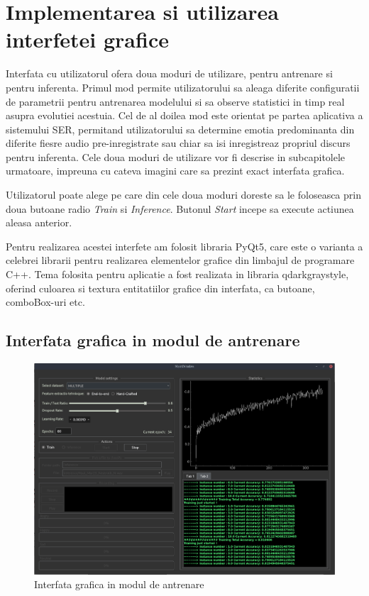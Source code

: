 \documentclass[a4paper,12pt]{book}
\begin{document}
	\section{Implementarea si utilizarea interfetei grafice}
		Interfata cu utilizatorul ofera doua moduri de utilizare, pentru antrenare si pentru inferenta. Primul mod permite utilizatorului sa aleaga diferite configuratii de parametrii pentru antrenarea modelului si sa observe statistici in timp real asupra evolutiei acestuia. Cel de al doilea mod este orientat pe partea aplicativa a sistemului SER, permitand utilizatorului sa determine emotia predominanta din diferite fiesre audio pre-inregistrate sau chiar sa isi inregistreaz propriul discurs pentru inferenta. Cele doua moduri de utilizare vor fi descrise in subcapitolele urmatoare, impreuna cu cateva imagini care sa prezint exact interfata grafica. \par 
		Utilizatorul poate alege pe care din cele doua moduri doreste sa le foloseasca prin doua butoane radio \textit{Train} si \textit{Inference}. Butonul \textit{Start} incepe sa execute actiunea aleasa anterior. \par
		
		Pentru realizarea acestei interfete am folosit libraria PyQt5, care este o varianta a celebrei librarii pentru realizarea elementelor grafice din limbajul de programare C++. Tema folosita pentru aplicatie a fost realizata in libraria qdarkgraystyle, oferind culoarea si textura entitatiilor grafice din interfata, ca butoane, comboBox-uri etc. 
		
		\subsection{Interfata grafica in modul de antrenare} \label{guiAntrenare}
		
		\begin{figure}[h]			
			\centering
			\includegraphics[scale=0.35]{gui_training}
			\caption{Interfata grafica in modul de antrenare}
			\label{fig:gui_train_1}
		\end{figure} 
		
\end{document}
